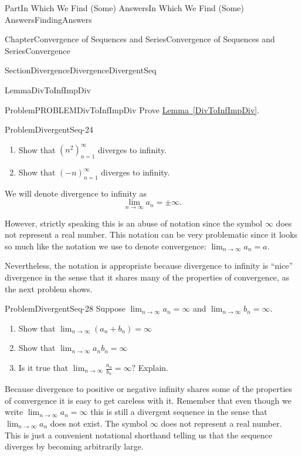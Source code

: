 \documentclass[oneside,10pt,]{book}
\newcommand{\xreffont}{\relax}
\numberwithin{equation}{part}
\def\limit#1#2#3{{\displaystyle\lim_{#1\rightarrow #2}#3}}
\begin{document}
\begin{partptx}{Part}{In Which We Find (Some) Answers}{}{In Which We Find (Some) Answers}{}{}{FindingAnswers}
\begin{chapterptx}{Chapter}{Convergence of Sequences and Series}{}{Convergence of Sequences and Series}{}{}{Convergence}
\begin{sectionptx}{Section}{Divergence}{}{Divergence}{}{}{DivergentSeq}
\begin{lemma}{Lemma}{}{}{DivToInfImpDiv}
\end{lemma}
\begin{problem}{Problem}{}{PROBLEMDivToInfImpDiv}%
Prove \hyperref[DivToInfImpDiv]{Lemma~{\xreffont\ref{DivToInfImpDiv}}}.%
\end{problem}
\begin{problem}{Problem}{}{DivergentSeq-24}%
\begin{enumerate}[font=\bfseries,label=(\alph*),ref=\alph*]%
\item{}Show that \(\left(n^2\right)_{n=1}^\infty\) diverges to infinity.%
\item{}Show that \(\left(-n\right)_{n=1}^\infty\) diverges to infinity.%
\end{enumerate}%
\end{problem}
We will denote divergence to infinity as%
\begin{equation*}
\limit{n}{\infty}{a_n}=\pm\infty\text{.}
\end{equation*}
%
\par
However, strictly speaking this is an abuse of notation since the symbol \(\infty\) does not represent a real number. This notation can be very problematic since it looks so much like the notation we use to denote convergence: \(\limit{n}{\infty}{a_n}=a\).%
\par
Nevertheless, the notation is appropriate because divergence to infinity is ``nice'' divergence in the sense that it shares many of the properties of convergence, as the next problem shows.%
\begin{problem}{Problem}{}{DivergentSeq-28}%
Suppose \(\limit{n}{\infty}{a_n}=\infty\) and \(\limit{n}{\infty}{b_n}=\infty\).%
\begin{enumerate}[font=\bfseries,label=(\alph*),ref=\alph*]%
\item{}Show that \(\limit{n}{\infty}{(a_n+b_n)}=\infty\)%
\item{}Show that \(\limit{n}{\infty}{a_nb_n}=\infty\)%
\item{}Is it true that \(\limit{n}{\infty}{\frac{a_n}{b_n}}=\infty?\) Explain.%
\end{enumerate}%
\end{problem}
Because divergence to positive or negative infinity shares some of the properties of convergence it is easy to get careless with it.  Remember that even though we write \(\limit{n}{\infty}{a_n}=\infty\) this is still a divergent sequence in the sense that \(\limit{n}{\infty}{a_n}\) does not exist.  The symbol \(\infty\) does not represent a real number.  This is just a convenient notational shorthand telling us that the sequence diverges by becoming arbitrarily large.%

\end{sectionptx}
\end{chapterptx}
\end{partptx}
\end{document}
